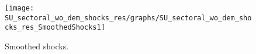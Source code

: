  
\begin{figure}[H]
\centering 
\texttt{[image: SU\_sectoral\_wo\_dem\_shocks\_res/graphs/SU\_sectoral\_wo\_dem\_shocks\_res\_SmoothedShocks1]}
\caption{Smoothed shocks.}\label{Fig:SmoothedShocks:1}
\end{figure}


